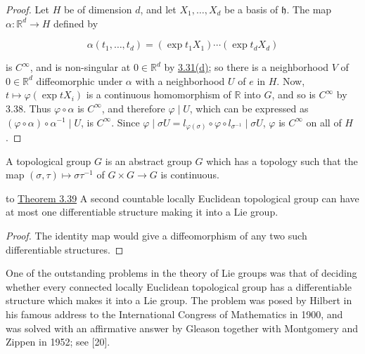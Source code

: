 \begin{proof}
Let $H$ be of dimension $d$, and let $X_{1}, \ldots, X_{d}$ be a basis of $\mathfrak{h}$. The map $\alpha: \mathbb{R}^{d} \to H$ defined by

\[
\alpha(t_{1},\ldots,t_{d})=(\exp t_{1}X_{1})\cdots(\exp t_{d}X_{d})
\]

is $C^{\infty}$, and is non-singular at $0\in\mathbb{R}^{d}$ by \hyperref[thm:3.31]{3.31(d)}; so there is a neighborhood $V$ of $0\in\mathbb{R}^{d}$ diffeomorphic under $\alpha$ with a neighborhood $U$ of $e$ in $H$. Now, $t\mapsto\varphi(\exp tX_{i})$ is a continuous homomorphism of $\mathbb{R}$ into $G$, and so is $C^{\infty}$ by 3.38. Thus $\varphi\circ\alpha$ is $C^{\infty}$, and therefore $\varphi\mid U$, which can be expressed as $(\varphi\circ\alpha)\circ\alpha^{-1}\mid U$, is $C^{\infty}$. Since $\varphi\mid\sigma U=l_{\varphi(\sigma)}\circ\varphi\circ l_{\sigma^{-1}}\mid\sigma U$, $\varphi$ is $C^{\infty}$ on all of $H$.

\end{proof}

\begin{definition}\label{thm:3.40}
A topological group $G$ is an abstract group $G$ which has a topology such that the map $(\sigma,\tau) \mapsto \sigma\tau^{-1}$ of $G \times G \to G$ is continuous. 

\end{definition}

\begin{corollary}{to \hyperref[thm:3.39]{Theorem 3.39}}\label{thm:3.41}
A second countable locally Euclidean topological group can have at most one differentiable structure making it into a Lie group.

\end{corollary}

\begin{proof}
The identity map would give a diffeomorphism of any two such differentiable structures.

\end{proof}

One of the outstanding problems in the theory of Lie groups was that of deciding whether every connected locally Euclidean topological group has a differentiable structure which makes it into a Lie group. The problem was posed by Hilbert in his famous address to the International Congress of Mathematics in 1900, and was solved with an affirmative answer by Gleason together with Montgomery and Zippen in 1952; see [20]. 

